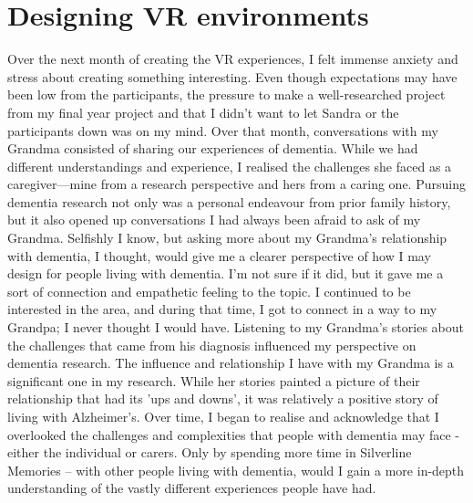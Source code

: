 \section{Designing VR environments}
\label{Relationships:DesigningVR}
Over the next month of creating the VR experiences, I felt immense anxiety and stress about creating something interesting. Even though expectations may have been low from the participants, the pressure to make a well-researched project from my final year project and that I didn't want to let Sandra or the participants down was on my mind. Over that month, conversations with my Grandma consisted of sharing our experiences of dementia. While we had different understandings and experience, I realised the challenges she faced as a caregiver—mine from a research perspective and hers from a caring one. Pursuing dementia research not only was a personal endeavour from prior family history, but it also opened up conversations I had always been afraid to ask of my Grandma. Selfishly I know, but asking more about my Grandma's relationship with dementia, I thought, would give me a clearer perspective of how I may design for people living with dementia. I'm not sure if it did, but it gave me a sort of connection and empathetic feeling to the topic. I continued to be interested in the area, and during that time, I got to connect in a way to my Grandpa; I never thought I would have. Listening to my Grandma's stories about the challenges that came from his diagnosis influenced my perspective on dementia research.  The influence and relationship I have with my Grandma is a significant one in my research. While her stories painted a picture of their relationship that had its 'ups and downs', it was relatively a positive story of living with Alzheimer's. Over time, I began to realise and acknowledge that I overlooked the challenges and complexities that people with dementia may face - either the individual or carers. Only by spending more time in Silverline Memories – with other people living with dementia, would I gain a more in-depth understanding of the vastly different experiences people have had.  

